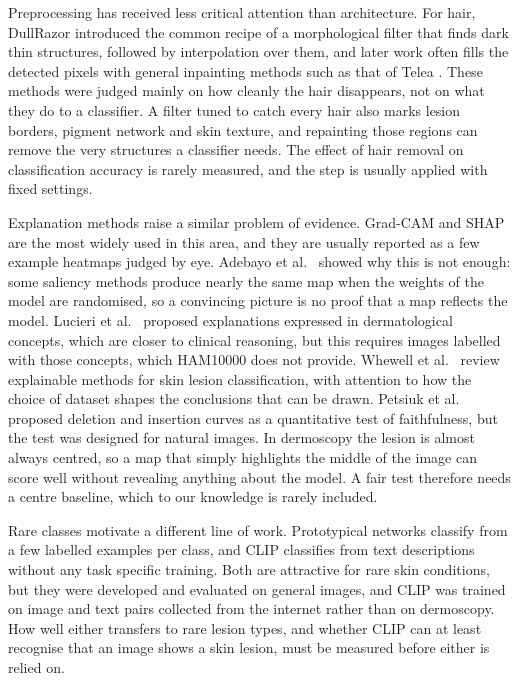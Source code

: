 \documentclass[runningheads]{llncs}
\begin{document}
Preprocessing has received less critical attention than architecture. For hair, DullRazor \cite{lee1997} introduced the common recipe of a morphological filter that finds dark thin structures, followed by interpolation over them, and later work often fills the detected pixels with general inpainting methods such as that of Telea \cite{telea2004}. These methods were judged mainly on how cleanly the hair disappears, not on what they do to a classifier. A filter tuned to catch every hair also marks lesion borders, pigment network and skin texture, and repainting those regions can remove the very structures a classifier needs. The effect of hair removal on classification accuracy is rarely measured, and the step is usually applied with fixed settings.

Explanation methods raise a similar problem of evidence. Grad-CAM \cite{selvaraju2017} and SHAP \cite{lundberg2017} are the most widely used in this area, and they are usually reported as a few example heatmaps judged by eye. Adebayo et al.\ \cite{adebayo2018} showed why this is not enough: some saliency methods produce nearly the same map when the weights of the model are randomised, so a convincing picture is no proof that a map reflects the model. Lucieri et al.\ \cite{lucieri2022} proposed explanations expressed in dermatological concepts, which are closer to clinical reasoning, but this requires images labelled with those concepts, which HAM10000 does not provide. Whewell et al.\ \cite{whewell2026} review explainable methods for skin lesion classification, with attention to how the choice of dataset shapes the conclusions that can be drawn. Petsiuk et al.\ \cite{petsiuk2018} proposed deletion and insertion curves as a quantitative test of faithfulness, but the test was designed for natural images. In dermoscopy the lesion is almost always centred, so a map that simply highlights the middle of the image can score well without revealing anything about the model. A fair test therefore needs a centre baseline, which to our knowledge is rarely included.

Rare classes motivate a different line of work. Prototypical networks \cite{snell2017} classify from a few labelled examples per class, and CLIP \cite{radford2021} classifies from text descriptions without any task specific training. Both are attractive for rare skin conditions, but they were developed and evaluated on general images, and CLIP was trained on image and text pairs collected from the internet rather than on dermoscopy. How well either transfers to rare lesion types, and whether CLIP can at least recognise that an image shows a skin lesion, must be measured before either is relied on.
\end{document}
